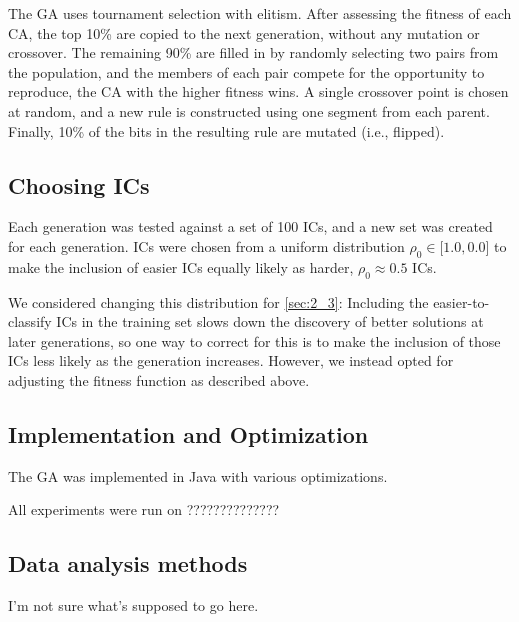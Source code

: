 The GA uses tournament selection with elitism. After assessing the fitness of each CA, the top 10\% are copied to the next generation, 
without any mutation or crossover. The remaining 90\% are filled in by randomly selecting two pairs from the population, and the members of 
each pair compete for the opportunity to reproduce, the CA with the higher fitness wins. A single crossover point is chosen at random, 
and a new rule is constructed using one segment from each parent. Finally, 10\% of the bits in the resulting rule are mutated (i.e., flipped).

\subsection{Choosing ICs}

Each generation was tested against a set of 100 ICs, and a new set was created for each generation. ICs were chosen 
from a uniform distribution $\rho_0 \in \lbrack1.0, 0.0\rbrack$ to make the inclusion of easier ICs equally likely as 
harder, $\rho_0 \approx 0.5$ ICs.

We considered changing this distribution for \ref{sec:2_3}: Including the easier-to-classify ICs in the training set 
slows down the discovery of better solutions at later generations, so one way to correct for this is to make the inclusion of 
those ICs less likely as the generation increases. However, we instead opted for adjusting the fitness function as described 
above.

\subsection{Implementation and Optimization}

The GA was implemented in Java with various optimizations. 

All experiments were run on ??????????????

\subsection{Data analysis methods}

I'm not sure what's supposed to go here.

